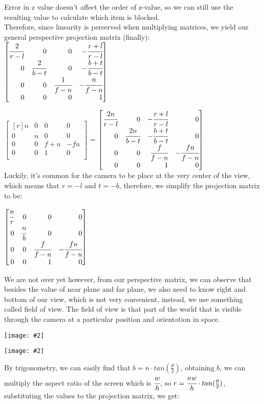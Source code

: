 \documentclass[11pt]{article}
\newcommand{\image}[2]{\texttt{[image: \#2]}}
\newcommand{\mat}[1]{
    $\begin{bmatrix*}[r]
        #1
    \end{bmatrix*}$
} %
\begin{document}
Error in z value doesn't affect the order of z-value, so we can still use the resulting value to calculate which item is blocked. \\
Therefore, since linearity is perserved when multiplying matrices, we yield our general perspective projection matrix (finally): \\
\mat{
    \cfrac{2}{r-l} & 0 & 0 & -\cfrac{r+l}{r-l}\\
    0 & \cfrac{2}{b-t} & 0 & -\cfrac{b+t}{b-t}\\
    0 & 0 & \cfrac{1}{f-n} & -\cfrac{n}{f-n} \\
    0 & 0 & 0 & 1
} \mat{
    n & 0 & 0 & 0 \\
    0 & n & 0 & 0 \\
    0 & 0 & f+n & -fn \\
    0 & 0 & 1 & 0 \\ 
} = \mat{
    \cfrac{2n}{r-l} & 0 & -\cfrac{r+l}{r-l} & 0\\
    0 & \cfrac{2n}{b-t} & -\cfrac{b+t}{b-t} & 0\\
    0 & 0 & \cfrac{f}{f-n} & -\cfrac{fn}{f-n} \\
    0 & 0 & 1 & 0
} \\
Luckily, it's common for the camera to be place at the very center of the view, which means that $r = -l$ and $t = -b$, therefore, we simplify the projection matrix to be:
\begin{center}
    \mat{
    \cfrac{n}{r} & 0 & 0 & 0\\
    0 & \cfrac{n}{b} & 0 & 0\\
    0 & 0 & \cfrac{f}{f-n} & -\cfrac{fn}{f-n} \\
    0 & 0 & 1 & 0
} 
\end{center}
We are not over yet however, from our perspective matrix, we can observe that besides the value of near plane and far plane, we also need to know right and bottom of our view, which is not very convenient, instead, we use something called field of view. The field of view is that part of the world that is visible through the camera at a particular position and orientation in space. 
\begin{center}
    \image{0.5}{field_of_view}
\end{center}
\begin{center}
    \image{0.5}{field_of_view_2}
\end{center}
By trigonometry, we can easily find that $b = n \cdot tan(\frac{\theta}{2})$, obtaining $b$, we can multiply the aspect ratio of the screen which is $\cfrac{w}{h}$, so $r = \cfrac{nw}{h}\cdot tan(\frac{\theta}{2})$, substituting the values to the projection matrix, we get:
\end{document}
